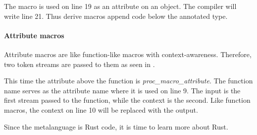 The macro is used on line 19 as an attribute on an object.
The compiler will write line 21.
Thus derive macros append code below the annotated type.

\paragraph{Attribute macros}
Attribute macros are like function-like macros with context-awareness.
Therefore, two token streams are passed to them as seen in .


This time the attribute above the function is \textit{proc\_macro\_attribute}.
The function \colorbox{function}{name} serves as the attribute name where it is used on line 9.
The \colorbox{input}{input} is the first stream passed to the function, while the \colorbox{context}{context} is the second.
Like function macros, the \colorbox{context}{context} on line 10 will be replaced with the \colorbox{output}{output}.

Since the metalanguage is Rust code, it is time to learn more about Rust.


